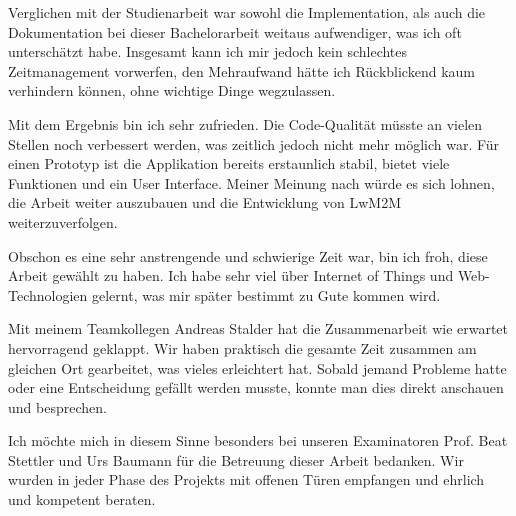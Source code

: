 Verglichen mit der Studienarbeit war sowohl die Implementation, als auch die Dokumentation bei dieser Bachelorarbeit weitaus aufwendiger, was ich oft unterschätzt habe. Insgesamt kann ich mir jedoch kein schlechtes Zeitmanagement vorwerfen, den Mehraufwand hätte ich Rückblickend kaum verhindern können, ohne wichtige Dinge wegzulassen.

Mit dem Ergebnis bin ich sehr zufrieden. Die Code-Qualität müsste an vielen Stellen noch verbessert werden, was zeitlich jedoch nicht mehr möglich war. Für einen Prototyp ist die Applikation bereits erstaunlich stabil, bietet viele Funktionen und ein User Interface. Meiner Meinung nach würde es sich lohnen, die Arbeit weiter auszubauen und die Entwicklung von LwM2M weiterzuverfolgen.

Obschon es eine sehr anstrengende und schwierige Zeit war, bin ich froh, diese Arbeit gewählt zu haben. Ich habe sehr viel über Internet of Things und Web-Technologien gelernt, was mir später bestimmt zu Gute kommen wird.

Mit meinem Teamkollegen Andreas Stalder hat die Zusammenarbeit wie erwartet hervorragend geklappt. Wir haben praktisch die gesamte Zeit zusammen am gleichen Ort gearbeitet, was vieles erleichtert hat. Sobald jemand Probleme hatte oder eine Entscheidung gefällt werden musste, konnte man dies direkt anschauen und besprechen. 

Ich möchte mich in diesem Sinne besonders bei unseren Examinatoren Prof. Beat Stettler und Urs Baumann für die Betreuung dieser Arbeit bedanken. Wir wurden in jeder Phase des Projekts mit offenen Türen empfangen und ehrlich und kompetent beraten.